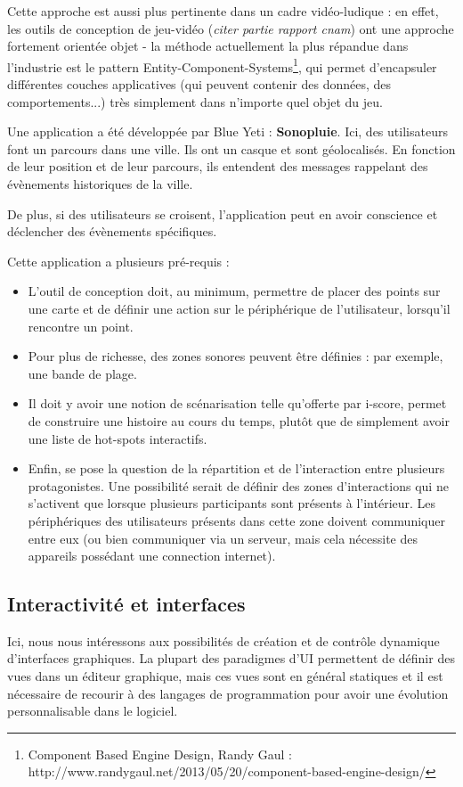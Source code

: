 \documentclass[french,12pt]{article}
\begin{document}
Cette approche est aussi plus pertinente dans un cadre vidéo-ludique : en effet, les outils de conception de jeu-vidéo (\textit{citer partie rapport cnam}) ont une approche fortement orientée objet - la méthode actuellement la plus répandue dans l'industrie est le pattern Entity-Component-Systems\footnote{Component Based Engine Design, Randy Gaul : http://www.randygaul.net/2013/05/20/component-based-engine-design/}, qui permet d'encapsuler différentes couches applicatives (qui peuvent contenir des données, des comportements...) très simplement dans n'importe quel objet du jeu.

Une application a été développée par Blue Yeti : \textbf{Sonopluie}.
Ici, des utilisateurs font un parcours dans une ville. Ils ont un casque et sont géolocalisés. En fonction de leur position et de leur parcours, ils entendent des messages rappelant des évènements historiques de la ville. 

De plus, si des utilisateurs se croisent, l'application peut en avoir conscience et déclencher des évènements spécifiques.

Cette application a plusieurs pré-requis : 
\begin{itemize}
\item L'outil de conception doit, au minimum, permettre de placer des points sur une carte et de définir une action sur le périphérique de l'utilisateur, lorsqu'il rencontre un point.
\item Pour plus de richesse, des zones sonores peuvent être définies : par exemple, une bande de plage.
\item Il doit y avoir une notion de scénarisation telle qu'offerte par i-score, permet de construire une histoire au cours du temps, plutôt que de simplement avoir une liste de hot-spots interactifs.
\item Enfin, se pose la question de la répartition et de l'interaction entre plusieurs protagonistes. Une possibilité serait de définir des zones d'interactions qui ne s'activent que lorsque plusieurs participants sont présents à l'intérieur. Les périphériques des utilisateurs présents dans cette zone doivent communiquer entre eux (ou bien communiquer via un serveur, mais cela nécessite des appareils possédant une connection internet).
\end{itemize}

\subsection{Interactivité et interfaces}
Ici, nous nous intéressons aux possibilités de création et de contrôle dynamique d'interfaces graphiques. La plupart des paradigmes d'UI permettent de définir des vues dans un éditeur graphique, mais ces vues sont en général statiques et il est nécessaire de recourir à des langages de programmation pour avoir une évolution personnalisable dans le logiciel. 
\end{document}
